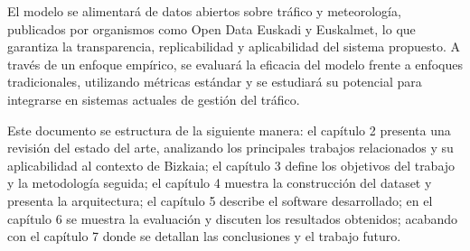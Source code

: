 El modelo se alimentará de datos abiertos sobre tráfico y meteorología, publicados por organismos como Open Data Euskadi y Euskalmet, lo que garantiza la transparencia, replicabilidad y aplicabilidad del sistema propuesto. A través de un enfoque empírico, se evaluará la eficacia del modelo frente a enfoques tradicionales, utilizando métricas estándar y se estudiará su potencial para integrarse en sistemas actuales de gestión del tráfico.

Este documento se estructura de la siguiente manera: el capítulo 2 presenta una revisión del estado del arte, analizando los principales trabajos relacionados y su aplicabilidad al contexto de Bizkaia; el capítulo 3 define los objetivos del trabajo y la metodología seguida; el capítulo 4 muestra la construcción del dataset y presenta la arquitectura; el capítulo 5 describe el software desarrollado; en el capítulo 6 se muestra la evaluación y discuten los resultados obtenidos; acabando con el capítulo 7 donde se detallan las conclusiones y el trabajo futuro.

